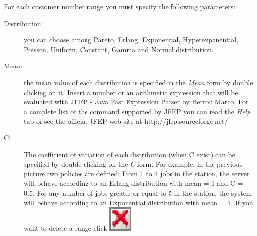 For each customer number range you must specify the following parameters:
\begin{description}
\item [Distribution:] you can choose among Pareto, Erlang, Exponential, Hyperexponential, Poisson, Uniform, Constant, Gamma and Normal distribution.
\item [Mean:] the mean value of each distribution is specified in the \emph{Mean} form by double clicking on it. Insert a number or an arithmetic expression that will be evaluated with JFEP - Java Fast Expression Parser by Bertoli Marco. For a complete list of the command supported by JFEP you can read the \emph{Help} tab or see
the official JFEP web site at http://jfep.sourceforge.net/
\item [C:] The coefficient of variation of each distribution (when C exist) can be specified by double clicking on the \emph{C} form. For example, in the previous picture two policies are defined:
From 1 to 4 jobs in the station, the server will behave according to an Erlang distribution with mean = 1 and C = 0.5. For any number of jobs greater or equal to 5 in the station, the system will behave according to an Exponential distribution with mean = 1.
If you want to delete a range click \includegraphics[scale=.5]{img/jsim/delete.eps}
\end{description}

